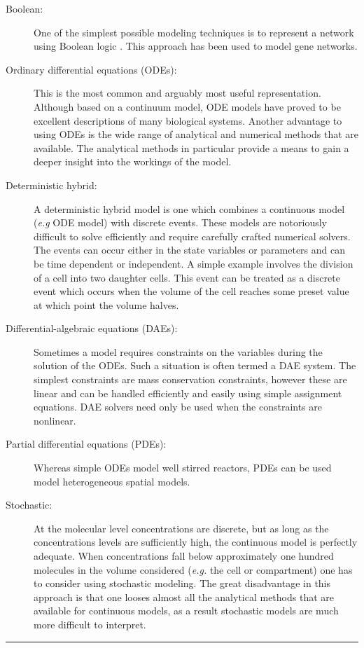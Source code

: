 \begin{description}
\item[Boolean:]
One of the simplest possible modeling techniques is to represent a
network using Boolean logic \autocite{DeJong2002}. This approach has
been used to model gene networks.

\item[Ordinary differential equations (ODEs):]
This is the most common and arguably most useful representation.
Although based on a continuum model, ODE models have proved to be
excellent descriptions of many biological systems. Another advantage to
using ODEs is the wide range of analytical and numerical methods that
are available. The analytical methods in particular provide a means to
gain a deeper insight into the workings of the model.

\item[Deterministic hybrid:]
A deterministic hybrid model is one which combines a continuous model
(\emph{e.g} ODE model) with discrete events. These models are
notoriously difficult to solve efficiently and require carefully crafted
numerical solvers. The events can occur either in the state variables or
parameters and can be time dependent or independent. A simple example
involves the division of a cell into two daughter cells. This event can
be treated as a discrete event which occurs when the volume of the cell
reaches some preset value at which point the volume halves.

\item[Differential-algebraic equations (DAEs):]
Sometimes a model requires constraints on the variables during the
solution of the ODEs. Such a situation is often termed a DAE system. The
simplest constraints are mass conservation constraints, however these
are linear and can be handled efficiently and easily using simple
assignment equations. DAE solvers need
only be used when the constraints are nonlinear.

\item[Partial differential equations (PDEs):]
Whereas simple ODEs model well stirred reactors, PDEs can be used model
heterogeneous spatial models.

\item[Stochastic:]
At the molecular level concentrations are discrete, but as long as the
concentrations levels are sufficiently high, the continuous model is
perfectly adequate. When concentrations fall below approximately one
hundred molecules in the volume considered (\emph{e.g.} the cell or
compartment) one has to consider using stochastic modeling. The great
disadvantage in this approach is that one looses almost all the
analytical methods that are available for continuous models, as a result
stochastic models are much more difficult to interpret.

\end{description}
\begin{center}\rule{3in}{0.4pt}\end{center}

